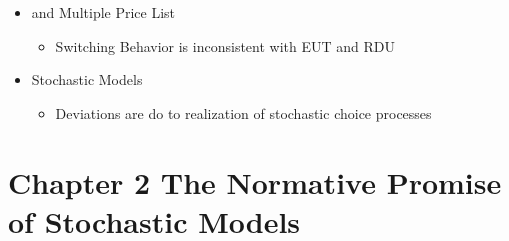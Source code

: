 \documentclass[12pt,a4paper]{article}\usepackage[]{graphicx}\usepackage[]{color}
\begin{document}
\begin{itemize}
\begin{itemize}
\begin{itemize}
				\end{itemize}
		\end{itemize}
	\item \textcite{Holt2002} and Multiple Price List
		\begin{itemize}
			\item Switching Behavior is inconsistent with EUT and RDU
		\end{itemize}
	\item Stochastic Models
		\begin{itemize}
			\item Deviations are do to realization of stochastic choice processes
		\end{itemize}
\end{itemize}

\section{Chapter 2 The Normative Promise of Stochastic Models}
\end{document}
